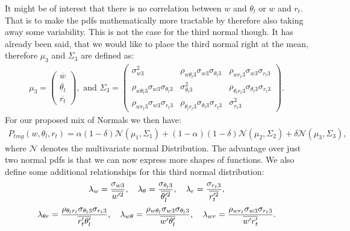 It might be of interest that there is no correlation between $w$ and $\theta_l$ or $w$ and $r_t$.
That is to make the \glspl{pdf} mathematically more tractable by therefore also taking away some variability.
This is not the case for the third normal though.
It has already been said, that we would like to place the third normal right at the mean, therefore $\mu_3$ and $\Sigma_3$ are defined as:
\begin{align*}
    \mu_3 =
    \begin{pmatrix}
        \overline{w}        \\
        \overline{\theta_l} \\
        \overline{r_t}
    \end{pmatrix},
    \text{ and }
    \Sigma_3 =
    \begin{pmatrix}
        \sigma_{w 3}^2 &
        \rho_{w \theta_l 3} \sigma_{w 3} \sigma_{\theta_l 3} &
        \rho_{w r_t 3} \sigma_{w 3} \sigma_{r_t 3} \\
        \rho_{w \theta_l 3} \sigma_{w 3} \sigma_{\theta_l 3} &
        \sigma_{\theta_l 3}^2 &
        \rho_{\theta_l r_t 3} \sigma_{\theta_l 3} \sigma_{r_t 3} \\
        \rho_{w r_t 3} \sigma_{w 3} \sigma_{r_t 3} &
        \rho_{\theta_l r_t 3} \sigma_{\theta_l 3} \sigma_{r_t 3} &
        \sigma_{r_t 3}^2
    \end{pmatrix}.
\end{align*}
For our proposed mix of Normals we then have:
\begin{align}
    \label{eq:normal_mix_pdf}
    P_{tmg}(w, \theta_l, r_t)
    = \alpha (1-\delta) \mathcal{N}(\mu_1, \Sigma_1)
    + (1-\alpha) (1-\delta) \mathcal{N}(\mu_2, \Sigma_2)
    + \delta \mathcal{N}(\mu_3, \Sigma_3),
\end{align}
where $\mathcal{N}$ denotes the multivariate normal Distribution.
The advantage over just two normal \glspl{pdf} is that we can now express more shapes of functions.
We also define some additional relationships for this third normal distribution:
\begin{align}
    \label{eq:lambda}
    \lambda_w = \frac{\sigma_{w 3}}{\overline{w'^2}}, \quad
    \lambda_\theta = \frac{\sigma_{\theta_l 3}}{\overline{\theta_l'^2}}, \quad
    \lambda_r = \frac{\sigma_{r_t 3}}{\overline{r_t'^2}},
\end{align}
\begin{align}
    \label{eq:lambda_two}
    \lambda_{\theta r} = \frac{\rho_{\theta_l r_t} \sigma_{\theta_l 3} \sigma_{r_t 3}}{\overline{r_t' \theta_l'}}, \quad
    \lambda_{w \theta} = \frac{\rho_{w \theta_l} \sigma_{w 3} \sigma_{\theta_l 3}}{\overline{w' \theta_l'}}, \quad
    \lambda_{w r} = \frac{\rho_{w r_t} \sigma_{w 3} \sigma_{r_t 3}}{\overline{w' r_t'}}.
\end{align}

